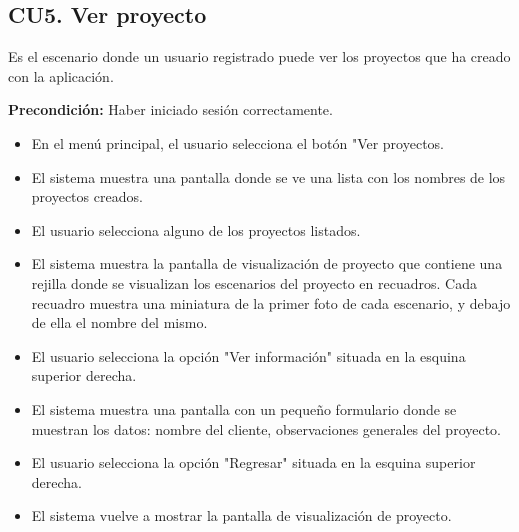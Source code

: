 \subsection{CU5. Ver proyecto}\par
Es el escenario donde un usuario registrado puede ver los proyectos que ha creado con la aplicación.\par
\textbf{Precondición:} Haber iniciado sesión correctamente.\par
\begin{itemize}
	\item En el menú principal, el usuario selecciona el botón "Ver proyectos.
	\item El sistema muestra una pantalla donde se ve una lista con los nombres de los proyectos creados.
	\item El usuario selecciona alguno de los proyectos listados.
	\item El sistema muestra la pantalla de visualización de proyecto que contiene una rejilla donde se visualizan los escenarios del proyecto en recuadros. Cada recuadro muestra una miniatura de la primer foto de cada escenario, y debajo de ella el nombre del mismo.
	\item El usuario selecciona la opción "Ver información" situada en la esquina superior derecha.
	\item El sistema muestra una pantalla con un pequeño formulario donde se muestran los datos: nombre del cliente, observaciones generales del proyecto.
	\item El usuario selecciona la opción "Regresar" situada en la esquina superior derecha.
	\item El sistema vuelve a mostrar la pantalla de visualización de proyecto.
\end{itemize}

